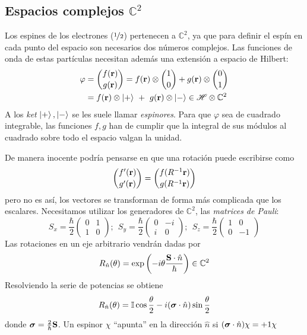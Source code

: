 \subsection{Espacios complejos $\mathbb{C}^2$}
Los espines de los electrones (${\nicefrac{1}{2}}$) pertenecen a
$\mathbb{C}^2$, ya que para definir el espín en cada punto del espacio
son necesarios dos números complejos. Las funciones de onda de estas
partículas necesitan además una extensión a espacio de Hilbert:
\begin{equation}
  \begin{split}
    \varphi &= \binom{f(\bm{\mathrm{r}})}{g(\bm{\mathrm{r}})} = f(\bm{\mathrm{r}})
    \otimes \binom{1}{0} + g(\bm{\mathrm{r}}) \otimes \binom{0}{1} \\
    &=  f(\bm{\mathrm{r}})
    \otimes \ket{+} \  + \  g(\bm{\mathrm{r}}) \otimes \ket{-} \in
     \mathscr{H} \otimes \mathbb{C}^2
  \end{split}
\end{equation}
A los \emph{ket} $\ket{+},\ket{-}$ se les suele llamar \emph{espinores}.
Para que $\varphi$ sea de cuadrado integrable, las funciones $f,g$ han de
cumplir que la integral de sus módulos al cuadrado sobre todo el
espacio valgan la unidad.

De manera inocente podría pensarse en que una rotación puede
escribirse como
\begin{equation}
  \binom{f'(\bm{\mathrm{r}})}{g'(\bm{\mathrm{r}})} = \binom{f(R^{-1}\bm{\mathrm{r}})}{g(R^{-1}\bm{\mathrm{r}})}
\end{equation}
pero no es así, los vectores se transforman de forma más complicada
que los escalares. Necesitamos utilizar los generadores de
$\mathbb{C}^2$, las \emph{matrices de Pauli}:
\begin{equation}
  S_x = \frac{\hbar}{2} \begin{pmatrix} 0 & 1 \\ 1 & 0 \end{pmatrix};  \ \ 
  S_y = \frac{\hbar}{2} \begin{pmatrix} 0 & -i \\ i & 0 \end{pmatrix};  \ \ 
  S_z = \frac{\hbar}{2} \begin{pmatrix} 1 & 0 \\ 0 & -1 \end{pmatrix}
\end{equation}
Las rotaciones en un eje arbitrario vendrán dadas por
\begin{equation}
  R_{\hat{n}}(\theta) = \exp \left( -i \theta
    \frac{\bm{\mathrm{S}}\cdot\hat{n}}{\hbar} \right) \in \mathbb{C}^2
\end{equation}
Resolviendo la serie de potencias se obtiene
\begin{equation}
  R_{\hat{n}}(\theta) = \mathbb{I}\cos \frac{\theta}{2} - i
  (\bm{\mathrm{\sigma}}\cdot \hat{n}) \sin \frac{\theta}{2}
\end{equation}
donde $\bm{\mathrm{\sigma}} = \frac{2}{\hbar}\bm{\mathrm{S}}$. Un espinor $\chi$
``apunta'' en la dirección $\hat{n}$ si
$(\bm{\mathrm{\sigma}}\cdot\hat{n})\chi = +1 \chi$

